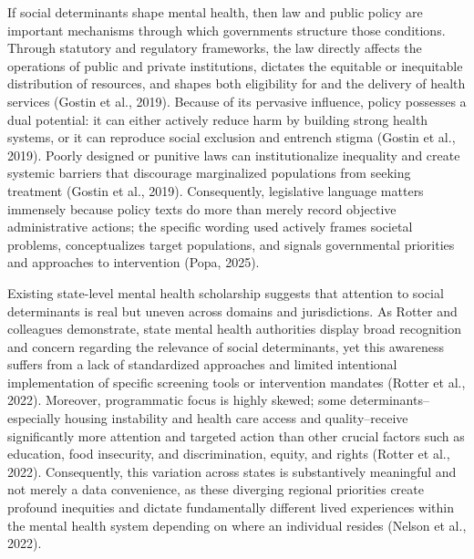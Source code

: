\documentclass[10pt,twocolumn]{article}
\begin{document}
If social determinants shape mental health, then law and public policy
are important mechanisms through which governments structure those
conditions. Through statutory and regulatory frameworks, the law
directly affects the operations of public and private institutions,
dictates the equitable or inequitable distribution of resources, and
shapes both eligibility for and the delivery of health services (Gostin
et al., 2019). Because of its pervasive influence, policy possesses a
dual potential: it can either actively reduce harm by building strong
health systems, or it can reproduce social exclusion and entrench stigma
(Gostin et al., 2019). Poorly designed or punitive laws can
institutionalize inequality and create systemic barriers that discourage
marginalized populations from seeking treatment (Gostin et al., 2019).
Consequently, legislative language matters immensely because policy
texts do more than merely record objective administrative actions; the
specific wording used actively frames societal problems, conceptualizes
target populations, and signals governmental priorities and approaches
to intervention (Popa, 2025).

Existing state-level mental health scholarship suggests that attention
to social determinants is real but uneven across domains and
jurisdictions. As Rotter and colleagues demonstrate, state mental health
authorities display broad recognition and concern regarding the
relevance of social determinants, yet this awareness suffers from a lack
of standardized approaches and limited intentional implementation of
specific screening tools or intervention mandates (Rotter et al., 2022).
Moreover, programmatic focus is highly skewed; some
determinants--especially housing instability and health care access and
quality--receive significantly more attention and targeted action than
other crucial factors such as education, food insecurity, and
discrimination, equity, and rights (Rotter et al., 2022). Consequently,
this variation across states is substantively meaningful and not merely
a data convenience, as these diverging regional priorities create
profound inequities and dictate fundamentally different lived
experiences within the mental health system depending on where an
individual resides (Nelson et al., 2022).
\end{document}
